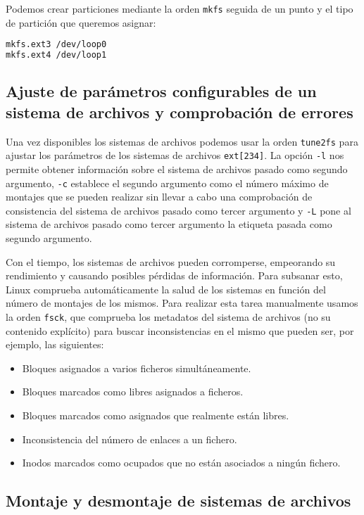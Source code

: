 \pagebreak

Podemos crear particiones mediante la orden \texttt{mkfs} seguida de un punto y el tipo de partición que queremos asignar:

\begin{lstlisting}[language=Bash]
mkfs.ext3 /dev/loop0
mkfs.ext4 /dev/loop1
\end{lstlisting}

\subsection{Ajuste de parámetros configurables de un sistema de archivos y comprobación de errores}

Una vez disponibles los sistemas de archivos podemos usar la orden \texttt{tune2fs} para ajustar los parámetros de los sistemas de archivos \texttt{ext[234]}.
La opción \texttt{-l} nos permite obtener información sobre el sistema de archivos pasado como segundo argumento, \texttt{-c} establece el segundo argumento como el número máximo de montajes que se pueden realizar sin llevar a cabo una comprobación de consistencia del sistema de archivos pasado como tercer argumento y \texttt{-L} pone al sistema de archivos pasado como tercer argumento la etiqueta pasada como segundo argumento.

Con el tiempo, los sistemas de archivos pueden corromperse, empeorando su rendimiento y causando posibles pérdidas de información.
Para subsanar esto, Linux comprueba automáticamente la salud de los sistemas en función del número de montajes de los mismos.
Para realizar esta tarea manualmente usamos la orden \texttt{fsck}, que comprueba los metadatos del sistema de archivos (no su contenido explícito) para buscar inconsistencias en el mismo que pueden ser, por ejemplo, las siguientes:

\begin{itemize}
	\item Bloques asignados a varios ficheros simultáneamente.
	\item Bloques marcados como libres asignados a ficheros.
	\item Bloques marcados como asignados que realmente están libres.
	\item Inconsistencia del número de enlaces a un fichero.
	\item Inodos marcados como ocupados que no están asociados a ningún fichero.
\end{itemize}

\subsection{Montaje y desmontaje de sistemas de archivos}

